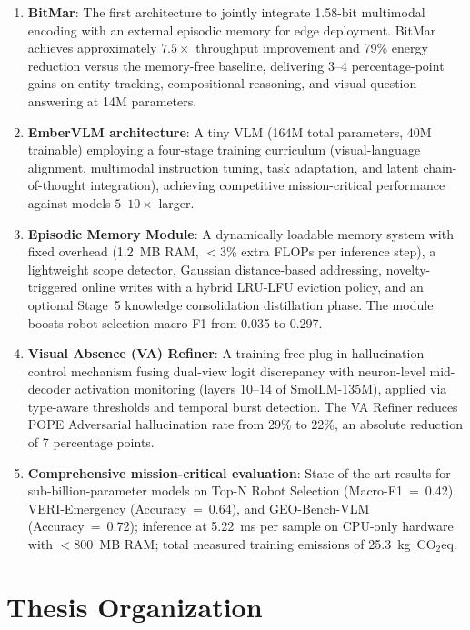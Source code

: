 \begin{enumerate}
    \item \textbf{BitMar}: The first architecture to jointly integrate 1.58-bit multimodal encoding with an external episodic memory for edge deployment. BitMar achieves approximately $7.5\times$ throughput improvement and 79\% energy reduction versus the memory-free baseline, delivering 3--4 percentage-point gains on entity tracking, compositional reasoning, and visual question answering at 14M parameters.

    \item \textbf{EmberVLM architecture}: A tiny VLM (164M total parameters, 40M trainable) employing a four-stage training curriculum (visual-language alignment, multimodal instruction tuning, task adaptation, and latent chain-of-thought integration), achieving competitive mission-critical performance against models $5\text{--}10\times$ larger.

    \item \textbf{Episodic Memory Module}: A dynamically loadable memory system with fixed overhead (1.2~MB RAM, $<$3\% extra FLOPs per inference step), a lightweight scope detector, Gaussian distance-based addressing, novelty-triggered online writes with a hybrid LRU-LFU eviction policy, and an optional Stage~5 knowledge consolidation distillation phase. The module boosts robot-selection macro-F1 from 0.035 to 0.297.

    \item \textbf{Visual Absence (VA) Refiner}: A training-free plug-in hallucination control mechanism fusing dual-view logit discrepancy with neuron-level mid-decoder activation monitoring (layers 10--14 of SmolLM-135M), applied via type-aware thresholds and temporal burst detection. The VA Refiner reduces POPE Adversarial hallucination rate from 29\% to 22\%, an absolute reduction of 7 percentage points.

    \item \textbf{Comprehensive mission-critical evaluation}: State-of-the-art results for sub-billion-parameter models on Top-N Robot Selection (Macro-F1~=~0.42), VERI-Emergency (Accuracy~=~0.64), and GEO-Bench-VLM (Accuracy~=~0.72); inference at 5.22~ms per sample on CPU-only hardware with $<$800~MB RAM; total measured training emissions of 25.3~kg~CO$_2$eq.
\end{enumerate}

\section{Thesis Organization}
\label{sec:intro_organization}

